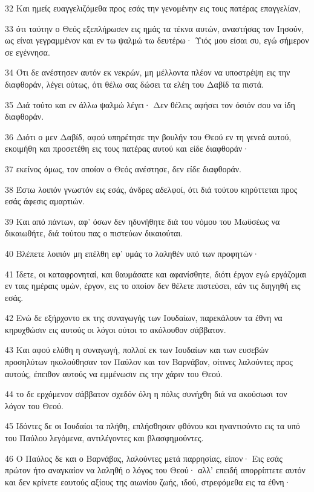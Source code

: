 \par 32 Και ημείς ευαγγελιζόμεθα προς εσάς την γενομένην εις τους πατέρας επαγγελίαν,
\par 33 ότι ταύτην ο Θεός εξεπλήρωσεν εις ημάς τα τέκνα αυτών, αναστήσας τον Ιησούν, ως είναι γεγραμμένον και εν τω ψαλμώ τω δευτέρω· Υιός μου είσαι συ, εγώ σήμερον σε εγέννησα.
\par 34 Ότι δε ανέστησεν αυτόν εκ νεκρών, μη μέλλοντα πλέον να υποστρέψη εις την διαφθοράν, λέγει ούτως, ότι θέλω σας δώσει τα ελέη του Δαβίδ τα πιστά.
\par 35 Διά τούτο και εν άλλω ψαλμώ λέγει· Δεν θέλεις αφήσει τον όσιόν σου να ίδη διαφθοράν.
\par 36 Διότι ο μεν Δαβίδ, αφού υπηρέτησε την βουλήν του Θεού εν τη γενεά αυτού, εκοιμήθη και προσετέθη εις τους πατέρας αυτού και είδε διαφθοράν·
\par 37 εκείνος όμως, τον οποίον ο Θεός ανέστησε, δεν είδε διαφθοράν.
\par 38 Έστω λοιπόν γνωστόν εις εσάς, άνδρες αδελφοί, ότι διά τούτου κηρύττεται προς εσάς άφεσις αμαρτιών.
\par 39 Και από πάντων, αφ' όσων δεν ηδυνήθητε διά του νόμου του Μωϋσέως να δικαιωθήτε, διά τούτου πας ο πιστεύων δικαιούται.
\par 40 Βλέπετε λοιπόν μη επέλθη εφ' υμάς το λαληθέν υπό των προφητών·
\par 41 Ίδετε, οι καταφρονηταί, και θαυμάσατε και αφανίσθητε, διότι έργον εγώ εργάζομαι εν ταις ημέραις υμών, έργον, εις το οποίον δεν θέλετε πιστεύσει, εάν τις διηγηθή εις εσάς.
\par 42 Ενώ δε εξήρχοντο εκ της συναγωγής των Ιουδαίων, παρεκάλουν τα έθνη να κηρυχθώσιν εις αυτούς οι λόγοι ούτοι το ακόλουθον σάββατον.
\par 43 Και αφού ελύθη η συναγωγή, πολλοί εκ των Ιουδαίων και των ευσεβών προσηλύτων ηκολούθησαν τον Παύλον και τον Βαρνάβαν, οίτινες λαλούντες προς αυτούς, έπειθον αυτούς να εμμένωσιν εις την χάριν του Θεού.
\par 44 το δε ερχόμενον σάββατον σχεδόν όλη η πόλις συνήχθη διά να ακούσωσι τον λόγον του Θεού.
\par 45 Ιδόντες δε οι Ιουδαίοι τα πλήθη, επλήσθησαν φθόνου και ηναντιούντο εις τα υπό του Παύλου λεγόμενα, αντιλέγοντες και βλασφημούντες.
\par 46 Ο Παύλος δε και ο Βαρνάβας, λαλούντες μετά παρρησίας, είπον· Εις εσάς πρώτον ήτο αναγκαίον να λαληθή ο λόγος του Θεού· αλλ' επειδή απορρίπτετε αυτόν και δεν κρίνετε εαυτούς αξίους της αιωνίου ζωής, ιδού, στρεφόμεθα εις τα έθνη·
